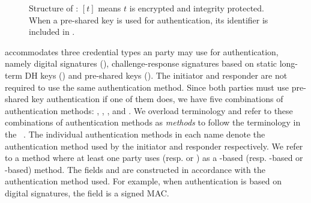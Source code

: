 %
%
\begin{figure}
\centering
{}
\caption{Structure of \mEdhoc{}: $[t]$ means $t$ is encrypted and integrity
protected. When a pre-shared key is used for authentication, its identifier is
included in \mMsgone{}.}
\label{fig:edhocFramework}
\end{figure}

\mEdhoc{} accommodates three credential types
an party may use for authentication, 
%
namely digital signatures (\mSig), challenge-response signatures based on
static long-term DH keys (\mStat) and pre-shared keys (\mPsk).
%
%
%
The initiator and responder are not required to use the same authentication
method.
%
Since both parties must use pre-shared key authentication if one of them does,
we have five combinations of authentication methods:
\mSigSig, \mSigStat, \mStatStat, \mStatSig{} and \mPskPsk.
%
We overload terminology and refer to these combinations of authentication methods as
\emph{methods} to follow the terminology in the \mEdhoc{}
\mSpec{}~\cite{our-analysis-selander-lake-edhoc-00}.
%
The individual authentication methods in each name denote the authentication
method used by the initiator and responder respectively.
%
We refer to a method where at least one party uses \mSig{}
(resp. \mStat{} or \mPsk{}) as a \mSig-based (resp. \mStat-based or \mPsk-based)
method.
%
The fields \mAuthi{} and \mAuthr{} are constructed in accordance with the
authentication method used.
%
For example, when authentication is based on digital signatures, the field is a
signed MAC.
%

